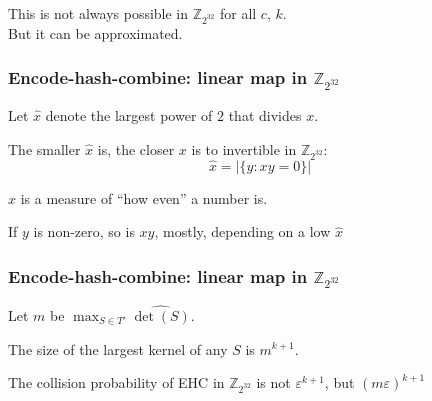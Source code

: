 \documentclass[xcolor=dvipsnames]{beamer}
\begin{document}
\begin{frame}
  \begin{center}
    This is not always possible in $\mathbb{Z}_{2^{32}}$ for all $c$, $k$.
  \\ \pause
  $ $ \\
  But it can be approximated.
  \end{center}
\end{frame}

\begin{frame}

  \frametitle{Encode-hash-combine: linear map \textbf{ in $\mathbb{Z}_{2^{32}}$}}


  $ $\\
  Let $\widehat{x}$ denote the largest power of $2$ that divides $x$.
  \pause

  $ $\\
  The smaller $\widehat{x}$ is, the closer $x$ is to invertible in $\mathbb{Z}_{2^{32}}$:
  \[
  \widehat{x} = \left|\{y : x y = 0\}\right|
  \]

  $\widehat{x}$ is a measure of ``how even'' a number is.
  \pause

  $ $\\
  If $y$ is non-zero, so is $x y$, mostly, depending on a low $\widehat{x}$
\end{frame}

\begin{frame}

  \frametitle{Encode-hash-combine: linear map \textbf{ in $\mathbb{Z}_{2^{32}}$}}

  Let $m$ be $\max_{S \in T'} \widehat{\det(S)}$.
  \pause

  $ $ \\
  The size of the largest kernel of any $S$ is $m^{k+1}$.
  \pause

  $ $ \\
  The collision probability of EHC in $\mathbb{Z}_{2^{32}}$ is not $\varepsilon^{k+1}$, but $(m \varepsilon)^{k+1}$
\end{frame}
\end{document}
